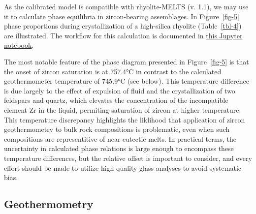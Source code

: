 \documentclass[
]{agujournal2019}
\begin{document}
As the calibrated model is compatible with rhyolite-MELTS (v. 1.1), we
may use it to calculate phase equilibria in zircon-bearing assemblages.
In Figure~\ref{fig-5} phase proportions during crystallization of a
high-silica rhyolite (Table~\ref{tbl-4}) are illustrated. The workflow
for this calculation is documented in
\href{notebooks/7-MELTS-with-Zr.ipynb}{this Jupyter notebook}.

The most notable feature of the phase diagram presented in
Figure~\ref{fig-5} is that the onset of zircon saturation is at 757.4°C
in contrast to the calculated geothermometer temperature of 745.9°C (see
below). This temperature difference is due largely to the effect of
expulsion of fluid and the crystallization of two feldspars and quartz,
which elevates the concentration of the incompatible element Zr in the
liquid, permiting saturation of zircon at higher temperature. This
temperature discrepancy highlights the liklihood that application of
zircon geothermometry to bulk rock compositions is problematic, even
when such compositions are representitive of near eutectic melts. In
practical terms, the uncertainty in calculated phase relations is large
enough to encompass these temperature differences, but the relative
offset is important to consider, and every effort should be made to
utilize high quality glass analyses to avoid systematic bias.

\subsection{Geothermometry}\label{geothermometry}
\end{document}
